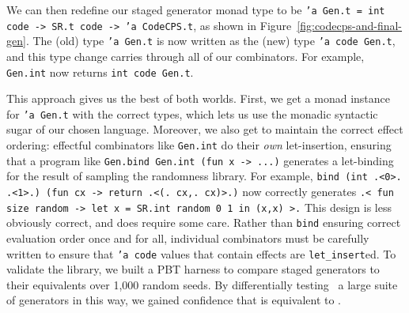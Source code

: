 \documentclass[acmsmall]{acmart}
\theoremstyle{definition}
\begin{document}
We can then redefine
our staged generator monad type to be
\texttt{'a Gen.t = int code -> SR.t code -> 'a CodeCPS.t}, as shown in Figure~\ref{fig:codecps-and-final-gen}.
The (old) type \texttt{'a Gen.t} is now written as the (new) type \texttt{'a code Gen.t}, and this type change
carries through all of our combinators. For example, \texttt{Gen.int} now returns \texttt{int code Gen.t}.

This approach gives us the best of both worlds. First, we get a monad instance for \texttt{'a Gen.t} with the correct types, which lets us
use the monadic syntactic sugar of our chosen language. Moreover, we also get to maintain the correct
effect ordering: effectful combinators like \texttt{Gen.int} do their \emph{own} let-insertion, ensuring
that a program like \texttt{Gen.bind Gen.int (fun x -> ...)} generates a let-binding for the result of sampling the randomness library.
For example, \texttt{bind (int .<0>. .<1>.) (fun cx -> return .<(.~cx,.~cx)>.)} now correctly generates
\texttt{.< fun size random -> let x = SR.int random 0 1 in (x,x) >.}
This design is less obviously correct, and does require some care. Rather than \texttt{bind} ensuring correct evaluation order once and for all,
individual combinators must be carefully written to ensure that \texttt{'a code} values that contain effects are \texttt{let\_insert}ed.
To validate the library, we built a PBT harness to compare staged generators to their \bq equivalents over 1,000 random seeds.
By differentially testing~\cite{difftesting} a large suite of generators in this way, we gained confidence that \camlname is equivalent to \bq{}.







\end{document}

